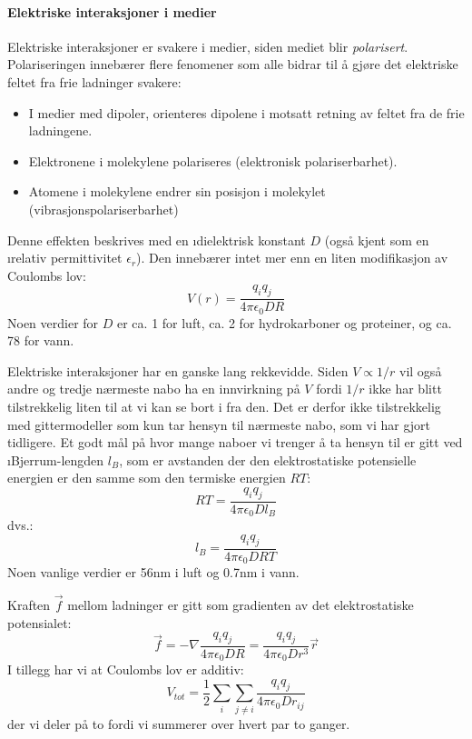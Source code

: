 \paragraph{Elektriske interaksjoner i medier} Elektriske interaksjoner er svakere i medier, siden mediet blir \emph{polarisert}.  Polariseringen innebærer flere fenomener som alle bidrar til å gjøre det elektriske feltet fra frie ladninger svakere:
\begin{itemize}
	\item I medier med dipoler, orienteres dipolene i motsatt retning av feltet fra de frie ladningene.
	\item Elektronene i molekylene polariseres (elektronisk polariserbarhet).
	\item Atomene i molekylene endrer sin posisjon i molekylet (vibrasjons\-polariserbarhet)
\end{itemize}
Denne effekten beskrives med en \i{dielektrisk konstant} $D$ (også kjent som en \i{relativ permittivitet} $\epsilon_r$). Den innebærer intet mer enn en liten modifikasjon av Coulombs lov:
\begin{equation}
	V(r)=\frac{q_iq_j}{4\pi\epsilon_0DR}
\end{equation}
Noen verdier for $D$ er ca. 1 for luft, ca. 2 for hydrokarboner og proteiner, og ca. 78 for vann.

Elektriske interaksjoner har en ganske lang rekkevidde. Siden $V\propto 1/r$ vil også andre og tredje nærmeste nabo ha en innvirkning på $V$ fordi $1/r$ ikke har blitt tilstrekkelig liten til at vi kan se bort i fra den. Det er derfor ikke tilstrekkelig med gittermodeller som kun tar hensyn til nærmeste nabo, som vi har gjort tidligere. Et godt mål på hvor mange naboer vi trenger å ta hensyn til er gitt ved \i{Bjerrum-lengden} $l_B$, som er avstanden der den elektrostatiske potensielle energien er den samme som den termiske energien $RT$:
\begin{equation}
	RT=\frac{q_iq_j}{4\pi\epsilon_0Dl_B}
\end{equation}
dvs.:
\begin{equation}
	l_B=\frac{q_iq_j}{4\pi\epsilon_0DRT}
\end{equation}
Noen vanlige verdier er 56nm i luft og 0.7nm i vann. 

Kraften $\vec{f}$ mellom ladninger er gitt som gradienten av det elektrostatiske potensialet:
\begin{equation}
	\vec{f}=-\nabla\frac{q_iq_j}{4\pi\epsilon_0DR}=\frac{q_iq_j}{4\pi\epsilon_0Dr^3}\vec{r}
\end{equation}
I tillegg har vi at Coulombs lov er additiv:
\begin{equation}
	V_{tot}=\frac{1}{2}\sum_{i}\sum_{j\neq i}\frac{q_iq_j}{4\pi\epsilon_0Dr_{ij}}
\end{equation}
der vi deler på to fordi vi summerer over hvert par to ganger.

